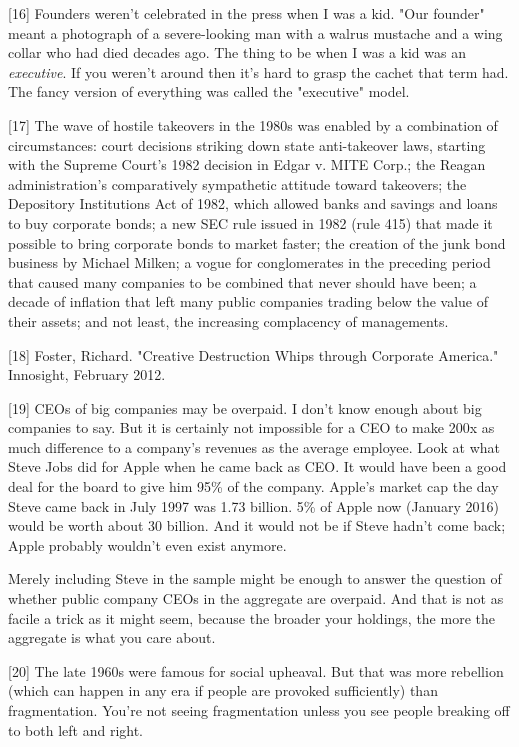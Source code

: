 [16]
Founders weren't celebrated in the press when I was a kid.
"Our founder" meant a photograph of a severe-looking man with a
walrus mustache and a wing collar who had died decades ago. The
thing to be when I was a kid was an \emph{executive}. If you weren't
around then it's hard to grasp the cachet that term had. The fancy
version of everything was called the "executive" model.

[17]
The wave of hostile takeovers in the 1980s was enabled by a
combination of circumstances: court decisions striking down state
anti-takeover laws, starting with the Supreme Court's 1982 decision
in Edgar v. MITE Corp.; the Reagan administration's comparatively
sympathetic attitude toward takeovers; the Depository Institutions
Act of 1982, which allowed banks and savings and loans to buy
corporate bonds; a new SEC rule issued in 1982 (rule 415) that made
it possible to bring corporate bonds to market faster; the creation
of the junk bond business by Michael Milken; a vogue for conglomerates
in the preceding period that caused many companies to be combined
that never should have been; a decade of inflation that left many
public companies trading below the value of their assets; and not
least, the increasing complacency of managements.

[18]
Foster, Richard. "Creative Destruction Whips through Corporate
America." Innosight, February 2012.

[19]
CEOs of big companies may be overpaid. I don't know enough
about big companies to say. But it is certainly not impossible for
a CEO to make 200x as much difference to a company's revenues as
the average employee.  Look at what Steve Jobs did for Apple when
he came back as CEO.  It would have been a good deal for the board
to give him 95\% of the company.  Apple's market cap the day Steve
came back in July 1997 was 1.73 billion. 5\% of Apple now (January
2016) would be worth about 30 billion.  And it would not be if Steve
hadn't come back; Apple probably wouldn't even exist anymore.

Merely including Steve in the sample might be enough to answer the
question of whether public company CEOs in the aggregate are overpaid.
And that is not as facile a trick as it might seem, because the
broader your holdings, the more the aggregate is what you care
about.

[20]
The late 1960s were famous for social upheaval. But that was
more rebellion (which can happen in any era if people are provoked
sufficiently) than fragmentation.  You're not seeing fragmentation
unless you see people breaking off to both left and right.


